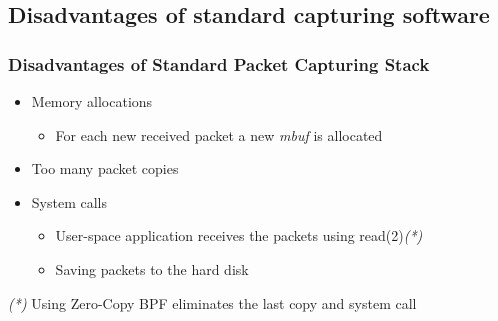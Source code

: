 \subsection*{Disadvantages of standard capturing software}
\begin{frame}
\frametitle{Disadvantages of Standard Packet Capturing Stack}
\begin{itemize}
	\item<1-> Memory allocations
		\begin{itemize}
			\item<1-> For each new received packet a new \emph{mbuf} 
				is allocated\newline
		\end{itemize}


	\item<2-> Too many packet copies
		\begin{itemize}
		\end{itemize}

	\item<3-> System calls
		\begin{itemize}
			\item<3-> User-space application receives the packets using read(2)\emph{(*)}
			\item<3-> Saving packets to the hard disk\newline
		\end{itemize}

\end{itemize}
\begin{tiny}
\emph{(*)} Using Zero-Copy BPF eliminates the last copy and system call
\end{tiny}
\end{frame}
